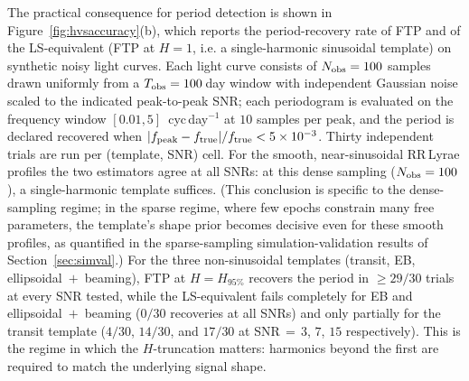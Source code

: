 \documentclass[apj]{emulateapj}
\begin{document}
The practical consequence for period detection is shown in
Figure~\ref{fig:hvsaccuracy}(b), which reports the period-recovery
rate of FTP and of the LS-equivalent (FTP at $H{=}1$, i.e. a
single-harmonic sinusoidal template) on synthetic noisy light
curves.  Each light curve consists of $N_{\rm obs} = 100$ samples
drawn uniformly from a $T_{\rm obs} = 100$\,day window with
independent Gaussian noise scaled to the indicated peak-to-peak
SNR; each periodogram is evaluated on the frequency window
$[0.01, 5]$~cyc\,day$^{-1}$ at $10$ samples per peak, and the
period is declared recovered when
$|f_{\rm peak} - f_{\rm true}|/f_{\rm true} < 5\times 10^{-3}$.
Thirty independent trials are run per (template, SNR) cell.
For the smooth, near-sinusoidal RR\,Lyrae profiles the two
estimators agree at all SNRs: at this dense sampling
($N_{\rm obs} = 100$), a single-harmonic template suffices.  (This
conclusion is specific to the dense-sampling regime; in the sparse
regime, where few epochs constrain many free parameters, the
template's shape prior becomes decisive even for these smooth
profiles, as quantified in the sparse-sampling simulation-validation
results of Section~\ref{sec:simval}.)
For the three non-sinusoidal templates (transit, EB,
ellipsoidal$\;+\;$beaming), FTP at $H = H_{95\%}$ recovers the
period in $\geq 29/30$ trials at every SNR tested, while the
LS-equivalent fails completely for EB and
ellipsoidal$\;+\;$beaming ($0/30$ recoveries at all SNRs) and only
partially for the transit template ($4/30$, $14/30$, and $17/30$
at SNR$\,=\,3$, $7$, $15$ respectively).  This is the regime in
which the $H$-truncation matters: harmonics beyond the first are
required to match the underlying signal shape.
\end{document}
